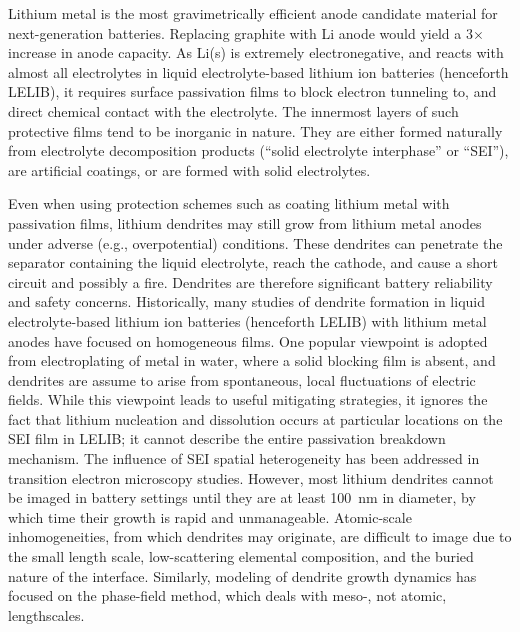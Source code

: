 \documentclass[prb,preprint,amsmath,amssymb]{revtex4}
\begin{document}
Lithium metal is the most gravimetrically efficient anode candidate material
for next-generation batteries.\cite{li1}  Replacing graphite with Li anode
would yield a 3$\times$ increase in anode capacity.  As Li(s) is extremely
electronegative, and reacts with almost all electrolytes in liquid
electrolyte-based lithium ion batteries (henceforth LELIB), it requires surface
passivation films to block electron tunneling to, and direct chemical contact
with the electrolyte.\cite{pnnl,cui,archer,jungjohann,dudney1} The innermost
layers of such protective films tend to be inorganic in nature.  They are
either formed naturally from electrolyte decomposition products (``solid
electrolyte interphase'' or ``SEI''), are artificial coatings, or are formed
with solid electrolytes.\cite{pearse,dudney}

Even when using protection schemes such as coating lithium metal with
passivation films, lithium dendrites may still grow
from lithium metal anodes under adverse (e.g., overpotential) conditions.
These dendrites can penetrate the separator containing the liquid electrolyte,
reach the cathode,\cite{naturetem,garcia} and cause a short circuit and possibly
a fire.  Dendrites are therefore significant battery reliability and safety
concerns.  Historically, many studies of dendrite formation in liquid
electrolyte-based lithium ion batteries (henceforth LELIB) with lithium metal
anodes have focused on homogeneous
films.\cite{newman,santosh1,holzwarth,yue1,yue}  One popular viewpoint is
adopted from electroplating of metal in water, where a solid blocking film is
absent, and dendrites are assume to arise from spontaneous, local fluctuations
of electric fields.  While this viewpoint leads to useful mitigating
strategies,\cite{pnnl} it ignores the fact that lithium nucleation and
dissolution occurs at
particular locations on the SEI film in LELIB;\cite{jungjohann} it cannot
describe the entire passivation breakdown mechanism. The influence of SEI
spatial heterogeneity has been addressed in transition electron
microscopy studies.\cite{jungjohann,naturetem}  However, most lithium dendrites
cannot be imaged in battery settings until they are at least 100~nm in diameter,
by which time their growth is rapid and unmanageable.  Atomic-scale
inhomogeneities, from which dendrites may originate, are difficult to image due
to the small length scale, low-scattering elemental composition, and the
buried nature of the interface.  Similarly, modeling
of dendrite growth dynamics has focused on the phase-field method,
which deals with meso-, not atomic, lengthscales.\cite{garcia}
\end{document}

